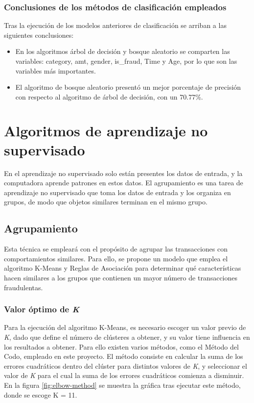 \subsubsection{Conclusiones de los métodos de clasificación empleados}
Tras la ejecución de los modelos anteriores de clasificación se arriban a las siguientes conclusiones:
\begin{itemize}
	\item En los algoritmos árbol de decisión y bosque aleatorio se comparten las variables: \textsf{category, amt, gender, is\_fraud, Time y Age}, por lo que son las variables más importantes.
	\item El algoritmo de bosque aleatorio presentó un mejor porcentaje de precisión con respecto al algoritmo de árbol de decisión, con un 70.77\%.
\end{itemize}

\section{Algoritmos de aprendizaje no supervisado}

En el aprendizaje no supervisado solo están presentes los datos de entrada, y la computadora aprende patrones en estos datos. El agrupamiento es una tarea de aprendizaje no supervisado que toma los datos de entrada y los organiza en grupos, de modo que objetos similares terminan en el mismo grupo. 

\subsection{Agrupamiento}
Esta técnica se empleará con el propósito de agrupar las transacciones con comportamientos similares. Para ello, se propone un modelo que emplea el algoritmo K-Means y Reglas de Asociación para determinar qué características hacen similares a los grupos que contienen un mayor número de transacciones fraudulentas.

\subsubsection{Valor óptimo de \emph{K}}
Para la ejecución del algoritmo K-Means, es necesario escoger un valor previo de \emph{K}, dado que define el número de clústeres a obtener, y su valor tiene influencia en los resultados a obtener. Para ello existen varios métodos, como el Método del Codo, empleado en este proyecto. El método consiste en calcular la suma de los errores cuadráticos dentro del clúster para distintos valores de \emph{K}, y seleccionar el valor de \emph{K} para el cual la suma de los errores cuadráticos comienza a disminuir. \\
En la figura \ref{fig:elbow-method} se muestra la gráfica tras ejecutar este método, donde se escoge K = 11.

